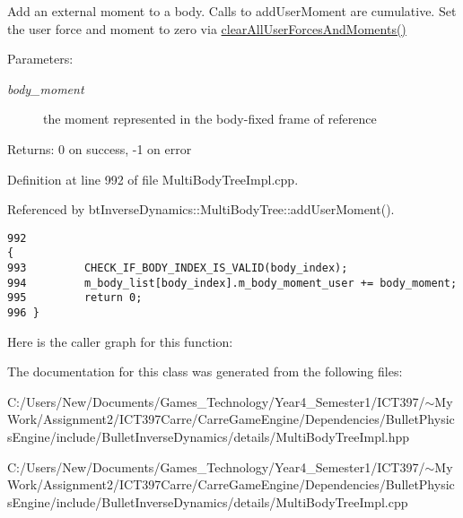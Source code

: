 Add an external moment to a body. Calls to addUserMoment are cumulative. Set the user force and moment to zero via \hyperlink{classbt_inverse_dynamics_1_1_multi_body_tree_66402f51ab131c39a4d309196ff7c743}{clearAllUserForcesAndMoments()} \begin{Desc}
\item[Parameters:]
\begin{description}
\item[{\em body\_\-moment}]the moment represented in the body-fixed frame of reference \end{description}
\end{Desc}
\begin{Desc}
\item[Returns:]0 on success, -1 on error \end{Desc}
 

Definition at line 992 of file MultiBodyTreeImpl.cpp.

Referenced by btInverseDynamics::MultiBodyTree::addUserMoment().

\begin{Code}\begin{verbatim}992                                                                                            {
993         CHECK_IF_BODY_INDEX_IS_VALID(body_index);
994         m_body_list[body_index].m_body_moment_user += body_moment;
995         return 0;
996 }
\end{verbatim}
\end{Code}




Here is the caller graph for this function:

The documentation for this class was generated from the following files:\begin{CompactItemize}
\item 
C:/Users/New/Documents/Games\_\-Technology/Year4\_\-Semester1/ICT397/$\sim$My Work/Assignment2/ICT397Carre/CarreGameEngine/Dependencies/BulletPhysicsEngine/include/BulletInverseDynamics/details/MultiBodyTreeImpl.hpp\item 
C:/Users/New/Documents/Games\_\-Technology/Year4\_\-Semester1/ICT397/$\sim$My Work/Assignment2/ICT397Carre/CarreGameEngine/Dependencies/BulletPhysicsEngine/include/BulletInverseDynamics/details/MultiBodyTreeImpl.cpp\end{CompactItemize}
